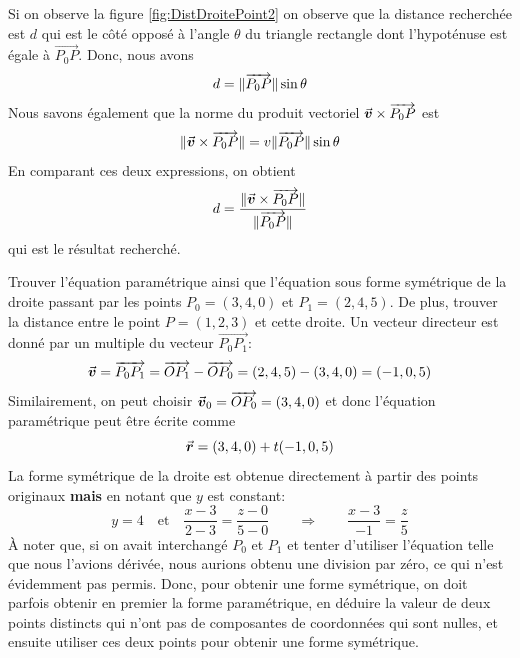 Si on observe la figure \ref{fig:DistDroitePoint2} on observe que la distance 
recherchée est $d$ qui est
le côté opposé à l'angle $\theta$ du triangle rectangle dont l'hypoténuse est
égale à $\overrightarrow{P_0 P}$. Donc, nous avons
\[
d = \lVert\overrightarrow{P_0P}\rVert\sin\theta
\]
Nous savons également que la norme du produit vectoriel $\vec{\boldsymbol{v}} \times \overrightarrow{P_0 P}$
est
\[
\lVert\vec{\boldsymbol{v}} \times \overrightarrow{P_0 P}\rVert = v \lVert\overrightarrow{P_0 P}\rVert \sin\theta
\]
En comparant ces deux expressions, on obtient
\[
d = \frac{\lVert\vec{\boldsymbol{v}} \times \overrightarrow{P_0 P}\rVert}{\lVert\overrightarrow{P_0 P}\rVert}
\]
qui est le résultat recherché.


\begin{exemple}
Trouver l'équation paramétrique ainsi que l'équation sous forme symétrique de la droite
passant par les points $P_0 = (3, 4, 0)$ et $P_1 = (2, 4, 5)$.  De plus, trouver la distance entre
le point $P=(1, 2, 3)$ et cette droite.
\solution
Un vecteur directeur est donné par un multiple du vecteur $\overrightarrow{P_0P_1}$:
\[
\vec{\boldsymbol{v}} = \overrightarrow{P_0P_1} = \overrightarrow{OP_1} - \overrightarrow{OP_0} = (2,4,5)-(3,4,0) = (-1,0,5) 
\]
Similairement, on peut choisir $\vec{\boldsymbol{v}}_0 = \overrightarrow{OP_0} = (3,4,0)$ et donc l'équation
paramétrique peut être écrite comme
\[
\vec{\boldsymbol{r}} = (3,4,0) + t(-1,0,5)
\]
La forme symétrique de la droite est obtenue directement à partir des points originaux \textbf{mais}
en notant que $y$ est constant:
\[
y=4 \quad\mbox{et}\quad \frac{x-3}{2-3} = \frac{z-0}{5-0} \qquad \Rightarrow\qquad  \frac{x-3}{-1} = \frac{z}{5}
\]
À noter que, si on avait interchangé $P_0$ et $P_1$ et tenter d'utiliser l'équation telle que nous l'avions
dérivée, nous aurions obtenu une division par zéro, ce qui n'est évidemment pas permis.  Donc, pour obtenir
une forme symétrique, on doit parfois obtenir en premier la forme paramétrique, en déduire la valeur de deux
points distincts qui n'ont pas de composantes de coordonnées qui sont nulles, et ensuite utiliser ces deux
points pour obtenir une forme symétrique.


\end{exemple}
